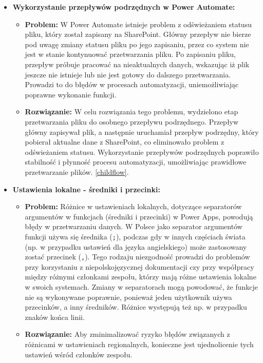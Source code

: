 \begin{itemize}
    \item \textbf{Wykorzystanie przepływów podrzędnych w Power Automate:}
          \begin{itemize}
              \item \textbf{Problem:} W Power Automate istnieje problem z odświeżaniem statusu pliku, który został zapisany na SharePoint. Główny przepływ nie bierze pod uwagę zmiany statusu pliku po jego zapisaniu, przez co system nie jest w stanie kontynuować przetwarzania pliku. Po zapisaniu pliku, przepływ próbuje pracować na nieaktualnych danych, wskazując iż plik jeszcze nie istnieje lub nie jest gotowy do dalszego przetwarzania. Prowadzi to do błędów w procesach automatyzacji, uniemożliwiając poprawne wykonanie funkcji.
              \item \textbf{Rozwiązanie:} W celu rozwiązania tego problemu, wydzielono etap przetwarzania pliku do osobnego przepływu podrzędnego. Przepływ główny zapisywał plik, a następnie uruchamiał przepływ podrzędny, który pobierał aktualne dane z SharePoint, co eliminowało problem z odświeżaniem statusu. Wykorzystanie przepływów podrzędnych poprawiło stabilność i płynność procesu automatyzacji, umożliwiając prawidłowe przetwarzanie plików.   \ref{childflow}. 
          \end{itemize}


    \item \textbf{Ustawienia lokalne - średniki i przecinki:}
          \begin{itemize}
              \item \textbf{Problem:} Różnice w ustawieniach lokalnych, dotyczące separatorów argumentów w funkcjach (średniki i przecinki) w Power Apps, powodują błędy w przetwarzaniu danych. W Polsce jako separator argumentów funkcji używa się średnika (\texttt{;}), podczas gdy w innych częściach świata (np. w przypadku ustawień dla języka angielskiego) może zastosowany zostać przecinek (\texttt{,}). Tego rodzaju niezgodność prowadzi do problemów przy korzystaniu z niepolskojęzycznej dokumentacji czy przy współpracy między różnymi członkami zespołu, którzy mają różne ustawienia lokalne w swoich systemach. Zmiany w separatorach mogą powodować, że funkcje nie są wykonywane poprawnie, ponieważ jeden użytkownik używa przecinków, a inny średników. Różnice występują też np. w przypadku znaków końca linii.
              \item \textbf{Rozwiązanie:} Aby zminimalizować ryzyko błędów związanych z różnicami w ustawieniach regionalnych, konieczne jest ujednolicenie tych ustawień wśród członków zespołu.
          \end{itemize}



\end{itemize}
